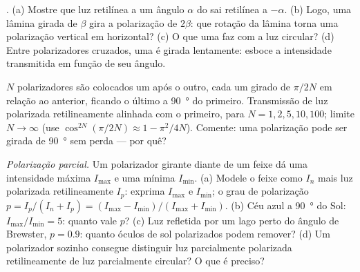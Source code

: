 \begin{exercise}[$\star\star$]\label{exo:b2:plane-waves-polarization:7}
. (a) Mostre que luz retilínea a um ângulo $\alpha$ do
 sai retilínea a $-\alpha$. (b) Logo, uma lâmina girada de $\beta$
gira a polarização de $2\beta$: que rotação da lâmina torna uma
polarização vertical em horizontal? (c) O que uma  faz com a
luz circular? (d) Entre polarizadores cruzados, uma  é
girada lentamente: esboce a intensidade transmitida em função de seu ângulo.
\end{exercise}

\begin{exercise}[$\star\star$]\label{exo:b2:plane-waves-polarization:8}
$N$ polarizadores são colocados um após o outro, cada um girado de
$\pi/2N$ em relação ao anterior, ficando o último a \qty{90}{\degree} do
primeiro. Transmissão de luz polarizada retilineamente alinhada com o primeiro,
para $N = 1, 2, 5, 10, 100$; limite $N \to \infty$ (use $\cos^{2N}(\pi/2N) \approx
1 - \pi^2/4N$). Comente: uma polarização pode ser girada de \qty{90}{\degree}
sem perda --- por quê?
\end{exercise}

\begin{exercise}[$\star\star$]\label{exo:b2:plane-waves-polarization:9}
\emph{Polarização parcial.} Um polarizador girante diante de um feixe
dá uma intensidade máxima $I_{\max}$ e uma mínima $I_{\min}$. (a) Modele o
feixe como  $I_n$ mais luz polarizada retilineamente $I_p$: exprima
$I_{\max}$ e $I_{\min}$; o grau de polarização $p = I_p/(I_n + I_p) =
(I_{\max} - I_{\min})/(I_{\max} + I_{\min})$. (b) Céu azul a \qty{90}{\degree} do
Sol: $I_{\max}/I_{\min} = 5$: quanto vale $p$? (c) Luz refletida por um lago perto
do ângulo de Brewster, $p = 0.9$: quanto óculos de sol polarizados podem remover?
(d) Um polarizador sozinho consegue distinguir luz parcialmente polarizada
retilineamente de luz parcialmente circular? O que é preciso?
\end{exercise}

